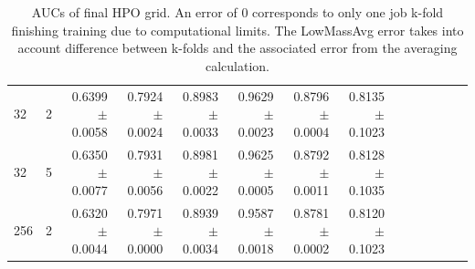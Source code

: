 \begin{table}
\begin{center}
{\begin{tabular}{llrrrrrrrrrrrr}
					32 &	2 &	0.6399	$\pm$	0.0058	&	0.7924	$\pm$	0.0024	&	0.8983	$\pm$	0.0033	&	0.9629	$\pm$	0.0023	&	0.8796	$\pm$	0.0004	&	0.8135	$\pm$	0.1023	\\
					32 &	5 &	0.6350	$\pm$	0.0077	&	0.7931	$\pm$	0.0056	&	0.8981	$\pm$	0.0022	&	0.9625	$\pm$	0.0005	&	0.8792	$\pm$	0.0011	&	0.8128	$\pm$	0.1035	\\
					256 &	2 &	0.6320	$\pm$	0.0044	&	0.7971	$\pm$	0.0000	&	0.8939	$\pm$	0.0034	&	0.9587	$\pm$	0.0018	&	0.8781	$\pm$	0.0002	&	0.8120	$\pm$	0.1023	\\
				\bottomrule
				\end{tabular}}
				\npnoround
				\caption{\label{tab:pnn_hpo_aucs}
				\glspl{AUC} of final \gls{HPO} grid. An error of 0 corresponds to only one job k-fold finishing training due to computational limits. The LowMassAvg error takes into account difference between k-folds and the associated error from the averaging calculation.
				  }
				  \end{center}
			\end{table}


